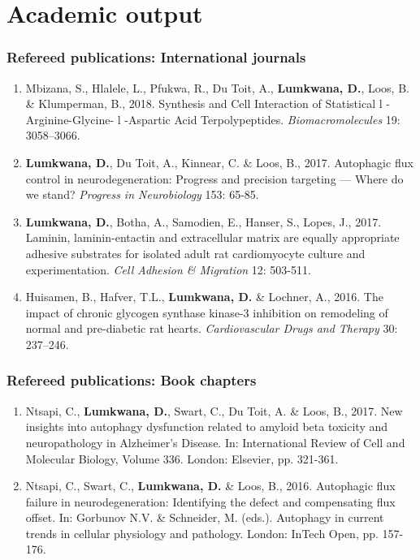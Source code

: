 \chapter{Academic output}

\subsection*{Refereed publications: International journals}
\begin{enumerate}
\item Mbizana, S., Hlalele, L., Pfukwa, R., Du Toit, A., \textbf{Lumkwana, D.}, Loos, B. \& Klumperman, B., 2018. Synthesis and Cell Interaction of Statistical l -Arginine-Glycine- l -Aspartic Acid Terpolypeptides. \textit{Biomacromolecules} 19: 3058–3066.
\item \textbf{Lumkwana, D.}, Du Toit, A., Kinnear, C. \& Loos, B., 2017. Autophagic flux control in neurodegeneration: Progress and precision targeting — Where do we stand? \textit{Progress in Neurobiology} 153: 65-85.
\item \textbf{Lumkwana, D.}, Botha, A., Samodien, E., Hanser, S., Lopes, J., 2017. Laminin, laminin-entactin and extracellular matrix are equally appropriate adhesive substrates for isolated adult rat cardiomyocyte culture and experimentation. \textit{Cell Adhesion \& Migration} 12: 503-511.
\item Huisamen, B., Hafver, T.L., \textbf{Lumkwana, D.} \& Lochner, A., 2016. The impact of chronic glycogen synthase kinase-3 inhibition on remodeling of normal and pre-diabetic rat hearts. \textit{Cardiovascular Drugs and Therapy} 30: 237–246.
\end{enumerate}

\subsection*{Refereed publications: Book chapters}
\begin{enumerate}
\item Ntsapi, C., \textbf{Lumkwana, D.}, Swart, C., Du Toit, A. \& Loos, B., 2017. New insights into autophagy dysfunction related to amyloid beta toxicity and neuropathology in Alzheimer’s Disease. In: International Review of Cell and Molecular Biology, Volume 336. London: Elsevier, pp. 321-361.
\item Ntsapi, C., Swart, C., \textbf{Lumkwana, D.} \& Loos, B., 2016. Autophagic flux failure in neurodegeneration: Identifying the defect and compensating flux offset. In: Gorbunov N.V. \& Schneider, M. (eds.). Autophagy in current trends in cellular physiology and pathology. London: InTech Open, pp. 157-176.
\end{enumerate}

